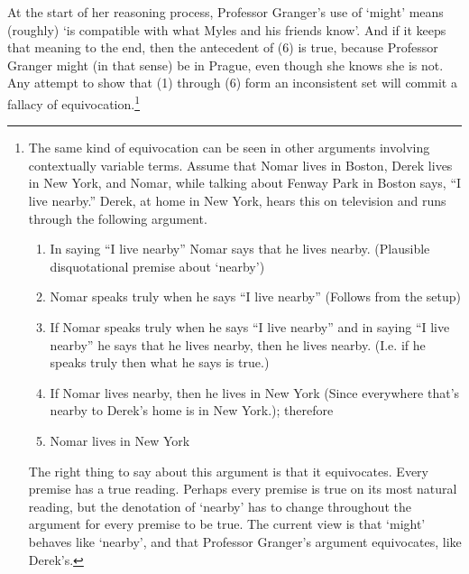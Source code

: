 At the start of her reasoning process, Professor Granger's use of `might' means (roughly) `is compatible with what Myles and his friends know'. And if it keeps that meaning to the end, then the antecedent of (6) is true, because Professor Granger might (in that sense) be in Prague, even though she knows she is not. Any attempt to show that (1) through (6) form an inconsistent set will commit a fallacy of equivocation.\footnote{The same kind of equivocation can be seen in other arguments involving contextually variable terms. Assume that Nomar lives in Boston, Derek lives in New York, and Nomar, while talking about Fenway Park in Boston says, ``I live nearby.'' Derek, at home in New York, hears this on television and runs through the following argument.
\renewcommand{\labelenumi}{\arabic{enumi}.} 
\begin{enumerate}
\item In saying ``I live nearby'' Nomar says that he lives nearby. (Plausible disquotational premise about `nearby')
\item Nomar speaks truly when he says ``I live nearby'' (Follows from the setup)
\item If Nomar speaks truly when he says ``I live nearby'' and in saying ``I live nearby'' he says that he lives nearby, then he lives nearby. (I.e. if he speaks truly then what he says is true.)
\item If Nomar lives nearby, then he lives in New York (Since everywhere that's nearby to Derek's home is in New York.); therefore
\item Nomar lives in New York
\end{enumerate}
\noindent The right thing to say about this argument is that it equivocates. Every premise has a true reading. Perhaps every premise is true on its most natural reading, but the denotation of `nearby' has to change throughout the argument for every premise to be true. The current view is that `might' behaves like 
`nearby', and that Professor Granger's argument equivocates, like Derek's. } 

\renewcommand{\labelenumi}{(\arabic{enumi})} 

